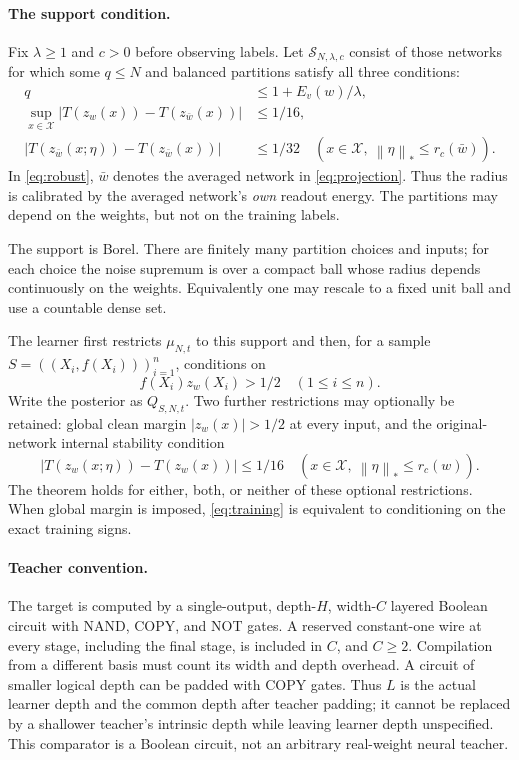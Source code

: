 \documentclass[11pt]{article}
\newcommand{\norm}[1]{\left\|#1\right\|}
\begin{document}
\paragraph{The support condition.}
Fix $\lambda\ge1$ and $c>0$ before observing labels. Let
$\mathcal S_{N,\lambda,c}$ consist of those networks for which some
$q\le N$ and balanced partitions satisfy all three conditions:
\begin{align}
 q&\le1+E_v(w)/\lambda,\label{eq:count}\\
 \sup_{x\in\mathcal X}|T(z_w(x))-T(z_{\bar w}(x))|
   &\le1/16,\label{eq:clean}\\
 |T(z_{\bar w}(x;\eta))-T(z_{\bar w}(x))|
   &\le1/32\quad
   (x\in\mathcal X,\ \norm\eta_*\le r_c(\bar w)).\label{eq:robust}
\end{align}
In \eqref{eq:robust}, $\bar w$ denotes the averaged network in
\eqref{eq:projection}. Thus the radius is calibrated by the averaged
network's \emph{own} readout energy. The partitions may depend on the
weights, but not on the training labels.

The support is Borel. There are finitely many partition choices and inputs;
for each choice the noise supremum is over a compact ball whose radius
depends continuously on the weights. Equivalently one may rescale to a fixed
unit ball and use a countable dense set.

The learner first restricts $\mu_{N,t}$ to this support and then, for a
sample $S=((X_i,f(X_i)))_{i=1}^n$, conditions on
\begin{equation}\label{eq:training}
 f(X_i)z_w(X_i)>1/2\quad(1\le i\le n).
\end{equation}
Write the posterior as $Q_{S,N,t}$. Two further restrictions may optionally
be retained: global clean margin $|z_w(x)|>1/2$ at every input, and the
original-network internal stability condition
\begin{equation}\label{eq:optional}
 |T(z_w(x;\eta))-T(z_w(x))|\le1/16
 \quad(x\in\mathcal X,\ \norm\eta_*\le r_c(w)).
\end{equation}
The theorem holds for either, both, or neither of these optional restrictions.
When global margin is imposed, \eqref{eq:training} is equivalent to
conditioning on the exact training signs.

\paragraph{Teacher convention.}
The target is computed by a single-output, depth-$H$, width-$C$ layered
Boolean circuit with NAND, COPY, and NOT gates. A reserved constant-one
wire at every stage, including the final stage, is included in $C$, and
$C\ge2$. Compilation from a different basis must count its width and depth
overhead. A circuit of smaller logical depth can be padded with COPY gates.
Thus $L$ is the actual learner depth and the common depth after teacher
padding; it cannot be replaced by a shallower teacher's intrinsic depth
while leaving learner depth unspecified. This comparator is a Boolean
circuit, not an arbitrary real-weight neural teacher.
\end{document}
